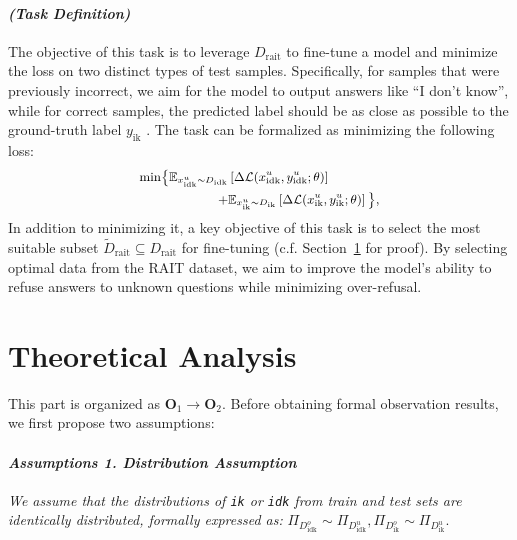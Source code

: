 \paragraph{\textit{(Task Definition)}}
The objective of this task is to leverage $D_{\text{rait}}$ to fine-tune a model and minimize the loss on two distinct types of test samples. Specifically, for samples that were previously incorrect, we aim for the model to output answers like ``I don't know'', while for correct samples, the predicted label should be as close as possible to the ground-truth label $y_{\text{ik}}$
. The task can be formalized as minimizing the following loss:
\begin{equation}
\small
\begin{aligned}
\label{eq:task}
\min \bigl \{ \mathbb{E}_{x^{u}_{{\text{idk}}} \sim D_{{\text{idk}}}} &\left[ \Delta \mathcal{L}(x^{u}_{{\text{idk}}}, y^{u}_{{\text{idk}}}; \theta) \right ]\\ +& \mathbb{E}_{x^{u}_{{\text{ik}}} \sim D_{{\text{ik}}}} \left[ \Delta \mathcal{L}(x^{u}_{{\text{ik}}}, y^{u}_{{\text{ik}}}; \theta) \right ] \bigl\},
\end{aligned}
\end{equation}
In addition to minimizing it, a key objective of this task is to select the most suitable subset $\widetilde{D}_{\text{rait}} \subseteq D_{\text{rait}}$ for fine-tuning (c.f. Section~\ref{sec:Theoretical Analysis} for proof). By selecting optimal data from the RAIT dataset, we aim to improve the model's ability to refuse answers to unknown questions while minimizing over-refusal.

\section{Theoretical Analysis}
\label{sec:Theoretical Analysis}
This part is organized as $\mathbf{O}_1 \to \mathbf{O}_2$. Before obtaining formal observation results, we first propose two assumptions:

\paragraph{\textit{Assumptions 1. Distribution Assumption}}
\textit{We assume that the distributions of \texttt{ik} or \texttt{idk} from train and test sets are identically distributed, formally expressed as:}
$
\Pi_{D_{\text{idk}}^o} \sim \Pi_{D_{\text{idk}}^{u}},  \Pi_{D_{\text{ik}}^o} \sim \Pi_{D_{\text{ik}}^{u}}
$.

